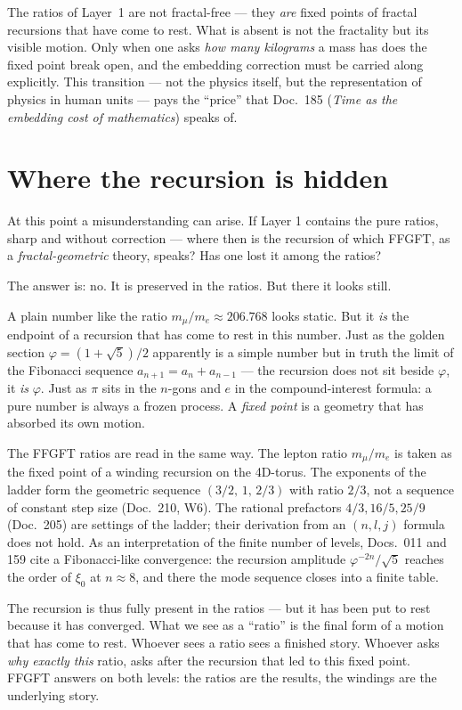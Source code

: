 The ratios of Layer~1 are not fractal-free --- they \emph{are} fixed
points of fractal recursions that have come to rest. What is absent is
not the fractality but its visible motion. Only when one asks
\emph{how many kilograms} a mass has does the fixed point break open,
and the embedding correction must be carried along explicitly. This
transition --- not the physics itself, but the representation of
physics in human units --- pays the ``price'' that Doc.~185
(\emph{Time as the embedding cost of mathematics}) speaks of.

\section{Where the recursion is hidden}

At this point a misunderstanding can arise. If Layer 1 contains the
pure ratios, sharp and without correction --- where then is the
recursion of which FFGFT, as a \emph{fractal-geometric} theory, speaks?
Has one lost it among the ratios?

The answer is: no. It is preserved in the ratios. But there it looks
still.

A plain number like the ratio $m_{\mu}/m_{e} \approx 206{.}768$ looks
static. But it \emph{is} the endpoint of a recursion that has come to
rest in this number. Just as the golden section
$\varphi = (1+\sqrt{5})/2$ apparently is a simple number but in truth
the limit of the Fibonacci sequence $a_{n+1} = a_{n} + a_{n-1}$ ---
the recursion does not sit beside $\varphi$, it \emph{is} $\varphi$.
Just as $\pi$ sits in the $n$-gons and $e$ in the compound-interest
formula: a pure number is always a frozen process. A \emph{fixed
point} is a geometry that has absorbed its own motion.

The FFGFT ratios are read in the same way. The lepton ratio
$m_{\mu}/m_{e}$ is taken as the fixed point of a winding recursion on
the 4D-torus. The exponents of the ladder form the geometric sequence
$(3/2,\,1,\,2/3)$ with ratio $2/3$, not a sequence of constant step
size (Doc.~210, W6). The rational prefactors $4/3, 16/5, 25/9$
(Doc.~205) are settings of the ladder; their derivation from an
$(n,l,j)$ formula does not hold. As an interpretation of the finite
number of levels, Docs.~011 and 159 cite a Fibonacci-like convergence:
the recursion amplitude $\varphi^{-2n}/\sqrt{5}$ reaches the order of
$\xi_{0}$ at $n \approx 8$, and there the mode sequence closes into a
finite table.

The recursion is thus fully present in the ratios --- but it has been
put to rest because it has converged. What we see as a ``ratio'' is
the final form of a motion that has come to rest. Whoever sees a ratio
sees a finished story. Whoever asks \emph{why exactly this} ratio,
asks after the recursion that led to this fixed point. FFGFT answers
on both levels: the ratios are the results, the windings are the
underlying story.


